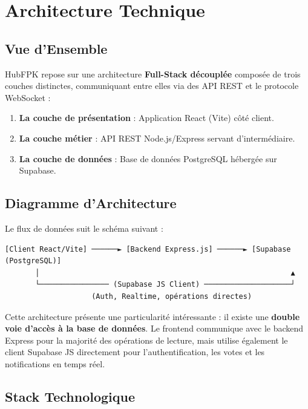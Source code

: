 \documentclass[12pt, a4paper]{report}
\begin{document}
\chapter{Architecture Technique}

\section{Vue d'Ensemble}

HubFPK repose sur une architecture \textbf{Full-Stack découplée} composée de trois couches distinctes, communiquant entre elles via des API REST et le protocole WebSocket :

\begin{enumerate}
    \item \textbf{La couche de présentation} : Application React (Vite) côté client.
    \item \textbf{La couche métier} : API REST Node.js/Express servant d'intermédiaire.
    \item \textbf{La couche de données} : Base de données PostgreSQL hébergée sur Supabase.
\end{enumerate}

\section{Diagramme d'Architecture}

Le flux de données suit le schéma suivant :

\begin{verbatim}
[Client React/Vite] ──────► [Backend Express.js] ──────► [Supabase (PostgreSQL)]
       │                                                          ▲
       └──────────────── (Supabase JS Client) ────────────────────┘
                    (Auth, Realtime, opérations directes)
\end{verbatim}

Cette architecture présente une particularité intéressante : il existe une \textbf{double voie d'accès à la base de données}. Le frontend communique avec le backend Express pour la majorité des opérations de lecture, mais utilise également le client Supabase JS directement pour l'authentification, les votes et les notifications en temps réel.

\section{Stack Technologique}
\end{document}

